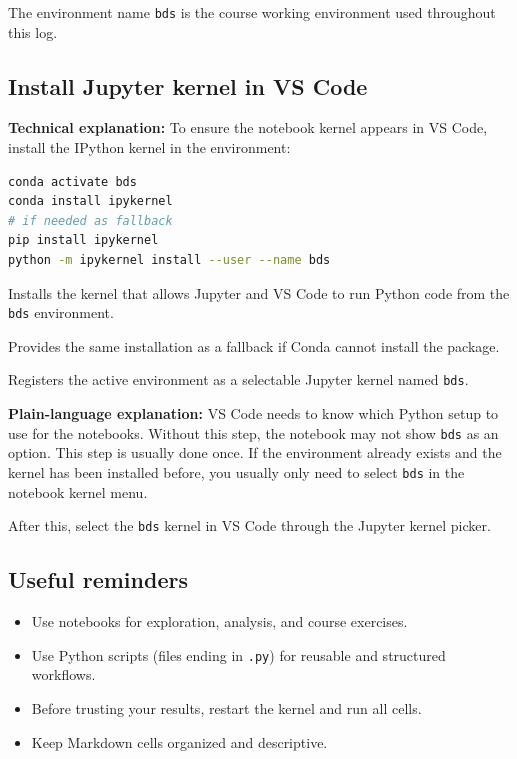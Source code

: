 \documentclass[11pt,a4paper]{article}
\begin{document}
The environment name \texttt{bds} is the course working environment used throughout this log.

\subsection{Install Jupyter kernel in VS Code}
\textbf{Technical explanation:} To ensure the notebook kernel appears in VS Code, install the IPython kernel in the environment:

\begin{lstlisting}[language=bash]
conda activate bds
conda install ipykernel
# if needed as fallback
pip install ipykernel
python -m ipykernel install --user --name bds
\end{lstlisting}

\begin{description}[leftmargin=2.8cm,style=multiline]
    \item[\texttt{conda install ipykernel}] Installs the kernel that allows Jupyter and VS Code to run Python code from the \texttt{bds} environment.
    \item[\texttt{pip install ipykernel}] Provides the same installation as a fallback if Conda cannot install the package.
    \item[\texttt{python -m ipykernel}] Registers the active environment as a selectable Jupyter kernel named \texttt{bds}.
\end{description}

\textbf{Plain-language explanation:} VS Code needs to know which Python setup to use for the notebooks. Without this step, the notebook may not show \texttt{bds} as an option. This step is usually done once. If the environment already exists and the kernel has been installed before, you usually only need to select \texttt{bds} in the notebook kernel menu.

After this, select the \texttt{bds} kernel in VS Code through the Jupyter kernel picker.

\subsection{Useful reminders}
\begin{itemize}[leftmargin=1.5em]
    \item Use notebooks for exploration, analysis, and course exercises.
    \item Use Python scripts (files ending in \texttt{.py}) for reusable and structured workflows.
    \item Before trusting your results, restart the kernel and run all cells.
    \item Keep Markdown cells organized and descriptive.
\end{itemize}
\end{document}
